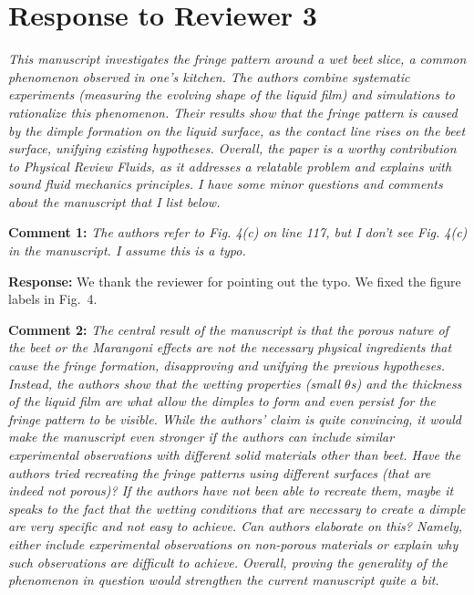 \documentclass[11pt]{article}
\newif\ifhighlight
\newcommand{\hl}[1]{\ifhighlight\textcolor{blue}{#1}\else#1\fi}
\begin{document}
\section*{Response to Reviewer 3}

\begin{siderules}
\textit{This manuscript investigates the fringe pattern around a wet beet slice, a common phenomenon observed in one’s kitchen. The authors combine systematic experiments (measuring the evolving shape of the liquid film) and simulations to rationalize this phenomenon. Their results show that the fringe pattern is caused by the dimple formation on the liquid surface, as the contact line rises on the beet surface, unifying existing hypotheses. Overall, the paper is a worthy contribution to Physical Review Fluids, as it addresses a relatable problem and explains with sound fluid mechanics principles. I have some minor questions and comments about the manuscript that I list below.
}
\end{siderules}

\bigskip
\begin{siderules}
\textbf{Comment 1:} \textit{The authors refer to Fig. 4(c) on line 117, but I don’t see Fig. 4(c) in the manuscript. I assume this is a typo.}
\end{siderules}

\textbf{Response:} We thank the reviewer for pointing out the typo. 
\hl{We fixed the figure labels in Fig.~4.}

\bigskip
\begin{siderules}
\textbf{Comment 2:} \textit{The central result of the manuscript is that the porous nature of the beet or the Marangoni effects are not the necessary physical ingredients that cause the fringe formation, disapproving and unifying the previous hypotheses. Instead, the authors show that the wetting properties (small $\theta$s) and the thickness of the liquid film are what allow the dimples to form and even persist for the fringe pattern to be visible. While the authors’ claim is quite convincing, it would make the manuscript even stronger if the authors can include similar experimental observations with different solid materials other than beet. Have the authors tried recreating the fringe patterns using different surfaces (that are indeed not porous)? If the authors have not been able to recreate them, maybe it speaks to the fact that the wetting conditions that are necessary to create a dimple are very specific and not easy to achieve. Can authors elaborate on this? Namely, either include experimental observations on non-porous materials or explain why such observations are difficult to achieve. Overall, proving the generality of the phenomenon in question would strengthen the current manuscript quite a bit.
}
\end{siderules}
\end{document}
